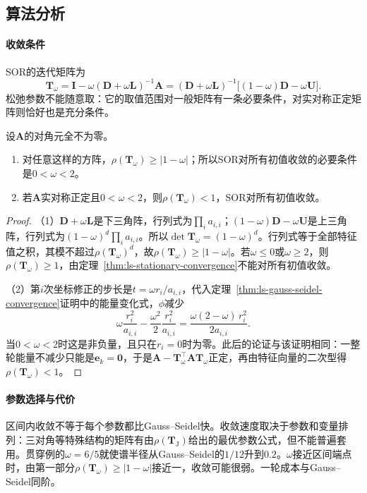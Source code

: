 \subsection{算法分析}

\paragraph{收敛条件}
SOR的迭代矩阵为
\[
\bm T_\omega=\bm I-\omega(\bm D+\omega\bm L)^{-1}\bm A=(\bm D+\omega\bm L)^{-1}\bigl[(1-\omega)\bm D-\omega\bm U\bigr].
\]
松弛参数不能随意取：它的取值范围对一般矩阵有一条必要条件，对实对称正定矩阵则恰好也是充分条件。
\begin{theorem}[SOR迭代的收敛条件]
\label{thm:ls-sor-convergence}
设$\bm A$的对角元全不为零。
\begin{enumerate}
\item 对任意这样的方阵，$\rho(\bm T_\omega)\geq|1-\omega|$；所以SOR对所有初值收敛的必要条件是$0<\omega<2$。
\item 若$\bm A$实对称正定且$0<\omega<2$，则$\rho(\bm T_\omega)<1$，SOR对所有初值收敛。
\end{enumerate}
\end{theorem}
\begin{proof}
（1）$\bm D+\omega\bm L$是下三角阵，行列式为$\prod_i a_{i,i}$；$(1-\omega)\bm D-\omega\bm U$是上三角阵，行列式为$(1-\omega)^d\prod_i a_{i,i}$。所以$\det\bm T_\omega=(1-\omega)^d$。行列式等于全部特征值之积，其模不超过$\rho(\bm T_\omega)^d$，故$\rho(\bm T_\omega)\geq|1-\omega|$。若$\omega\leq0$或$\omega\geq2$，则$\rho(\bm T_\omega)\geq1$，由定理~\ref{thm:ls-stationary-convergence}不能对所有初值收敛。

（2）第$i$次坐标修正的步长是$t=\omega r_i/a_{i,i}$，代入定理~\ref{thm:ls-gauss-seidel-convergence}证明中的能量变化式，$\phi$减少
\[
\omega\frac{r_i^2}{a_{i,i}}-\frac{\omega^2}{2}\frac{r_i^2}{a_{i,i}}=\frac{\omega(2-\omega)\,r_i^2}{2a_{i,i}} .
\]
当$0<\omega<2$时这是非负量，且只在$r_i=0$时为零。此后的论证与该证明相同：一整轮能量不减少只能是$\bm e_k=\bm0$，于是$\bm A-\bm T_\omega^\top\bm A\bm T_\omega$正定，再由特征向量的二次型得$\rho(\bm T_\omega)<1$。
\end{proof}

\paragraph{参数选择与代价}
区间内收敛不等于每个参数都比Gauss--Seidel快。收敛速度取决于参数和变量排列：三对角等特殊结构的矩阵有由$\rho(\bm T_{\mathrm J})$给出的最优参数公式，但不能普遍套用。贯穿例的$\omega=6/5$就使谱半径从Gauss--Seidel的$1/12$升到$0.2$。$\omega$接近区间端点时，由第一部分$\rho(\bm T_\omega)\geq|1-\omega|$接近一，收敛可能很弱。一轮成本与Gauss--Seidel同阶。

